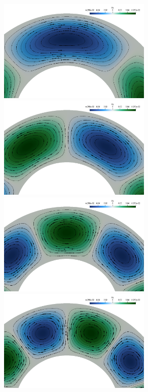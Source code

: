 \begin{center}
\includegraphics[width=7.3cm]{python_codes/fieldstone_35/results/iso_k2}
\includegraphics[width=7.3cm]{python_codes/fieldstone_35/results/iso_k3}\\
\includegraphics[width=7.3cm]{python_codes/fieldstone_35/results/iso_k4}
\includegraphics[width=7.3cm]{python_codes/fieldstone_35/results/iso_k5}
\end{center}







